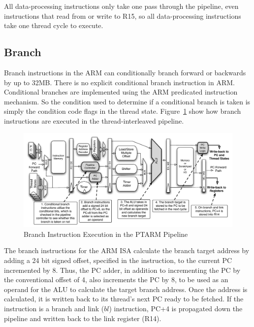 All data-processing instructions only take one pass through the pipeline, even instructions that read from or write to R15, so all data-processing instructions take one thread cycle to execute. 
\subsection{Branch}
Branch instructions in the ARM can conditionally branch forward or backwards by up to 32MB.
There is no explicit conditional branch instruction in ARM.
Conditional branches are implemented using the ARM predicated instruction mechanism.
So the condition used to determine if a conditional branch is taken is simply the condition code flags in the thread state. 
Figure~\ref{fig:branch_pipeline_implementation} show how branch instructions are executed in the thread-interleaved pipeline.

\begin{figure}
  \vspace{-20pt}
  \begin{center}
    \includegraphics[scale=.54]{figs/branch_pipeline_implementation}
  \end{center}
  \vspace{-20pt}
  \caption{Branch Instruction Execution in the PTARM Pipeline}
  \label{fig:branch_pipeline_implementation}
\end{figure}

The branch instructions for the ARM ISA calculate the branch target address by adding a 24 bit signed offset, specified in the instruction, to the current PC incremented by 8. 
Thus, the PC adder, in addition to incrementing the PC by the conventional offset of 4, also increments the PC by 8, to be used as an operand for the ALU to calculate the target branch address.
Once the address is calculated, it is written back to its thread's next PC ready to be fetched. 
If the instruction is a branch and link ($bl$) instruction, PC+4 is propagated down the pipeline and written back to the link register (R14).   

